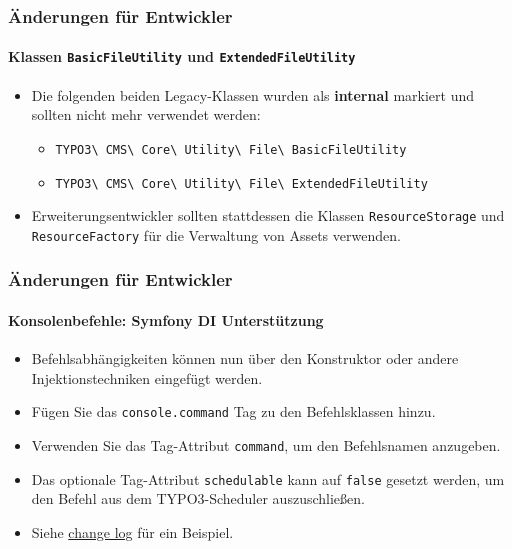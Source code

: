 \begin{frame}[fragile]
	\frametitle{Änderungen für Entwickler}
	\framesubtitle{Klassen \texttt{BasicFileUtility} und \texttt{ExtendedFileUtility}}

	\begin{itemize}
		\item Die folgenden beiden Legacy-Klassen wurden als \textbf{internal} markiert
			und sollten nicht mehr verwendet werden:

			\begin{itemize}\small
				\item \texttt{TYPO3\textbackslash
					CMS\textbackslash
					Core\textbackslash
					Utility\textbackslash
					File\textbackslash
					BasicFileUtility}
				\item \texttt{TYPO3\textbackslash
					CMS\textbackslash
					Core\textbackslash
					Utility\textbackslash
					File\textbackslash
					ExtendedFileUtility}
			\end{itemize}

		\item Erweiterungsentwickler sollten stattdessen die Klassen \texttt{ResourceStorage}
			und \texttt{ResourceFactory} für die Verwaltung von Assets verwenden.

	\end{itemize}

\end{frame}


\begin{frame}[fragile]
	\frametitle{Änderungen für Entwickler}
	\framesubtitle{Konsolenbefehle: Symfony DI Unterstützung}

	\begin{itemize}
		\item Befehlsabhängigkeiten können nun über den Konstruktor oder andere Injektionstechniken eingefügt werden.
		\item Fügen Sie das \texttt{console.command} Tag zu den Befehlsklassen hinzu.
		\item Verwenden Sie das Tag-Attribut \texttt{command}, um den Befehlsnamen anzugeben.
		\item Das optionale Tag-Attribut \texttt{schedulable} kann auf \texttt{false}
			gesetzt werden, um den Befehl aus dem TYPO3-Scheduler auszuschließen.

		\item Siehe
			\href{https://docs.typo3.org/c/typo3/cms-core/master/en-us/Changelog/10.3/Feature-89139-AddDependencyInjectionSupportForConsoleCommands.html}{change log}
			für ein Beispiel.
	\end{itemize}

\end{frame}

